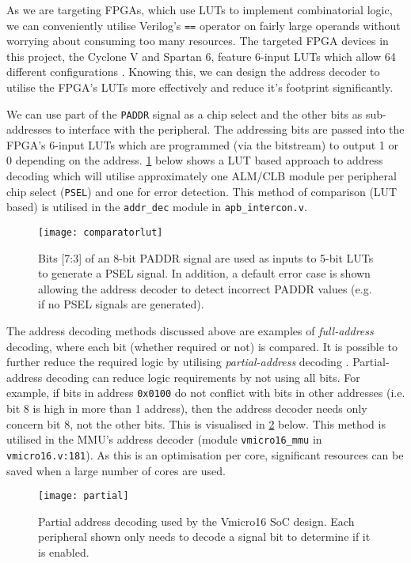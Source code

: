 As we are targeting FPGAs, which use LUTs to implement combinatorial logic, we can conveniently utilise Verilog's \verb|==| operator on fairly large operands without worrying about consuming too many resources. The targeted FPGA devices in this project, the Cyclone V and Spartan 6, feature 6-input LUTs which allow 64 different configurations \cite{s6clb, cvclb}. Knowing this, we can design the address decoder to utilise the FPGA's LUTs more effectively and reduce it's footprint significantly.

We can use part of the \verb|PADDR| signal as a chip select and the other bits as sub-addresses to interface with the peripheral. The addressing bits are passed into the FPGA's 6-input LUTs which are programmed (via the bitstream) to output 1 or 0 depending on the address. \cref{fig:comparatorlut} below shows a LUT based approach to address decoding which will utilise approximately one ALM/CLB module per peripheral chip select (\verb|PSEL|) and one for error detection. This method of comparison (LUT based) is utilised in the \verb|addr_dec| module in \verb|apb_intercon.v|.

\begin{figure}[H]
\centering
\texttt{[image: comparatorlut]}
\caption{Bits [7:3] of an 8-bit PADDR signal are used as inputs to 5-bit LUTs to generate a PSEL signal. In addition, a default error case is shown allowing the address decoder to detect incorrect PADDR values (e.g. if no PSEL signals are generated).}
\label{fig:comparatorlut}
\end{figure}

The address decoding methods discussed above are examples of \textit{full-address} decoding, where each bit (whether required or not) is compared. It is possible to further reduce the required logic by utilising \textit{partial-address} decoding \cite{tanenbaum2016structured}. Partial-address decoding can reduce logic requirements by not using all bits. For example, if bits in address \verb|0x0100| do not conflict with bits in other addresses (i.e. bit 8 is high in more than 1 address), then the address decoder needs only concern bit 8, not the other bits. This is visualised in \cref{fig:partial} below. This method is utilised in the MMU's address decoder (module \verb|vmicro16_mmu| in \verb|vmicro16.v:181|). As this is an optimisation per core, significant resources can be saved when a large number of cores are used.

\begin{figure}[H]
\centering
\texttt{[image: partial]}
\caption{Partial address decoding used by the Vmicro16 SoC design. Each peripheral shown only needs to decode a signal bit to determine if it is enabled.}
\label{fig:partial}
\end{figure}


